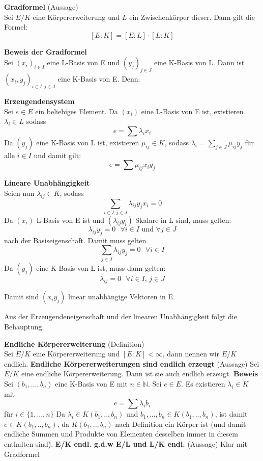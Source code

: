 \documentclass[a4paper, 10pt]{scrartcl}
\begin{document}
\textbf{Gradformel} (Aussage)\\
Sei $E/K$ eine Körpererweiterung und $L$ ein Zwischenkörper dieser. Dann gilt die Formel:
$$[E:K] = [E:L] \cdot [L:K]$$

\textbf{Beweis der Gradformel}\\
Sei $(x_i)_{i \in I}$ eine L-Basis von E und $(y_j)_{j \in J}$ eine K-Basis von L. Dann ist $(x_i,y_j)_{i \in I, j \in J}$ eine K-Basis von E. Denn: \newline

\textbf{Erzeugendensystem}\\
Sei $e \in E$ ein beliebiges Element. Da $(x_i)$ eine L-Basis von E ist, existieren $\lambda_i \in L$ sodass $$e = \sum \lambda_i x_i$$
Da $(y_j)$ eine K-Basis von L ist, existieren $\mu_{ij} \in K$, sodass $\lambda_i = \sum_{j \in J} \mu_{ij} y_j$ für alle $i \in I$ und damit gilt:
$$ e = \sum \mu_{ij} x_i y_j$$
\newline

\textbf{Lineare Unabhängigkeit}\\
Seien nun $\lambda_{ij} \in K$, sodass $$\sum_{i \in I, j \in J} \lambda_{ij} y_j x_i = 0$$
Da $(x_i)$ L-Basis von E ist und $(\lambda_{ij}y_i)$ Skalare in L sind, muss gelten:
$$\lambda_{ij} y_j = 0 \text{ } \forall i \in I \text{ und } \forall j \in J$$
nach der Basiseigenschaft.\newline
Damit muss gelten $$\sum_{j \in J} \lambda_{ij}y_j = 0 \text{ } \forall i \in I$$ Da $(y_j)$ eine K-Basis von L ist, muss dann gelten: $$\lambda_{ij} = 0 \text{ } \forall i \in I \text{, } j \in J$$

Damit sind $(x_i y_j)$ linear unabhängige Vektoren in E.

Aus der Erzeugendeneigenschaft und der linearen Unabhängigkeit folgt die Behauptung.
\newline

\textbf{Endliche Körpererweiterung} (Definition)\\
Sei $E/K$ eine Körpererweiterung und $[E:K] < \infty$, dann nennen wir $E/K$ endlich.
\newline
\newline
\textbf{Endliche Körpererweiterungen sind endlich erzeugt} (Aussage)
Sei $E/K$ eine endliche Körpererweiterung. Dann ist sie auch endlich erzeugt.\newline
\textbf{Beweis}\newline
Sei $(b_1,...,b_n)$ eine K-Basis von E mit $n \in \mathbb{N}$. Sei $e \in E$.\newline
Es existieren $\lambda_i \in K$ mit $$e = \sum \lambda_i b_i$$ für $i \in \{1,...,n\}$
Da $\lambda_i \in K(b_1,..,b_n)$ und $b_1,...,b_n \in K(b_1,..,b_n)$, ist damit $e \in K(b_1,..,b_n)$, da $K(b_1,..,b_n)$ nach Definition ein Körper ist (und damit endliche Summen und Produkte von Elementen desselben immer in diesem enthalten sind).\newline
\newline
\newline
\textbf{E/K endl. g.d.w E/L und L/K endl.} (Aussage) \newline
Klar mit Gradformel
\end{document}
